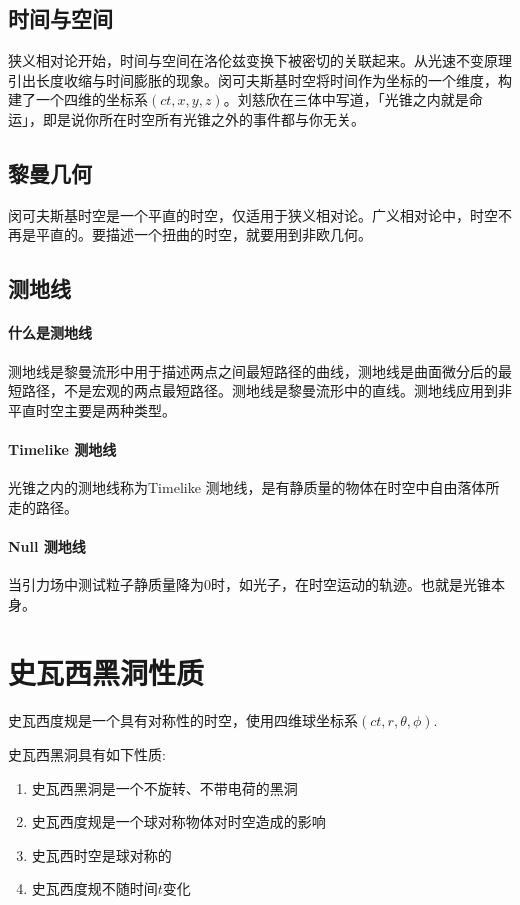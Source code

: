 \subsection{时间与空间}
狭义相对论开始，时间与空间在洛伦兹变换下被密切的关联起来。从光速不变原理引出长度收缩与时间膨胀的现象。闵可夫斯基时空将时间作为坐标的一个维度，构建了一个四维的坐标系$\left(ct,x,y,z\right)$。刘慈欣在三体中写道，「光锥之内就是命运」\cite{three-body}，即是说你所在时空所有光锥之外的事件都与你无关。

\subsection{黎曼几何}
闵可夫斯基时空是一个平直的时空，仅适用于狭义相对论。广义相对论中，时空不再是平直的。要描述一个扭曲的时空，就要用到非欧几何。

\subsection{测地线}
\paragraph{什么是测地线}
测地线是黎曼流形中用于描述两点之间最短路径的曲线，测地线是曲面微分后的最短路径，不是宏观的两点最短路径。测地线是黎曼流形中的直线。测地线应用到非平直时空主要是两种类型。
\paragraph{Timelike 测地线}
光锥之内的测地线称为Timelike 测地线，是有静质量的物体在时空中自由落体所走的路径。
\paragraph{Null 测地线}
当引力场中测试粒子静质量降为0时，如光子，在时空运动的轨迹。也就是光锥本身。


\section{史瓦西黑洞性质}
史瓦西度规是一个具有对称性的时空，使用四维球坐标系$\left(ct,r,\theta,\phi\right)$.

史瓦西黑洞具有如下性质:
\begin{enumerate}
    \item 史瓦西黑洞是一个不旋转、不带电荷的黑洞
    \item 史瓦西度规是一个球对称物体对时空造成的影响
    \item 史瓦西时空是球对称的
    \item 史瓦西度规不随时间$t$变化
\end{enumerate}

